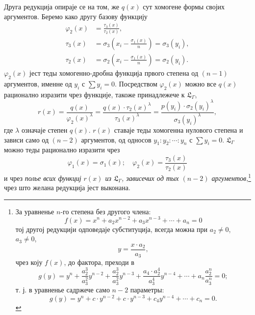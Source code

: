 ﻿\documentclass[11pt]{article}
\begin{document}
Друга редукција опираје се на том, же $q(x)$ сут хомогене формы својих аргументов. Беремо како другу базову функцију
\[
\begin{aligned}
\varphi_2(x)&=\frac{\tau_3(x)}{\tau_2(x)},\\
\tau_3(x)&=\sigma_3\left(x_i-\frac{\sigma_1(x)}{n}\right)=\sigma_3(y_i),\\
\tau_2(x)&=\sigma_2\left(x_i-\frac{\sigma_1(x)}{n}\right)=\sigma_2(y_i).
\end{aligned}
\]
$\varphi_2(x)$ јест теды хомогенно-дробна функција првого степена од $(n-1)$ аргументов, именне од $y_i$ с $\sum y_i=0$. Посредством $\varphi_2(x)$ можно все $q(x)$ рационално изразити чрез функције, такоже принадлежече к $\mathfrak L_\Gamma$,
\[
r(x)=\frac{q(x)}{\varphi_2(x)^\lambda}=\frac{q(x)\cdot\tau_2(x)^\lambda}{\tau_3(x)^\lambda}=\frac{p(y_i)\cdot\sigma_2(y_i)^\lambda}{\sigma_3(y_i)^\lambda},
\]
где $\lambda$ означаје степен $q(x)$. $r(x)$ ставаје теды хомогенна нулового степена и зависи само од $(n-2)$ аргументов, од односов $y_1:y_2:\cdots:y_n$ с $\sum y_i=0$. $\mathfrak L_\Gamma$ можно теды рационално изразити чрез
\[
\varphi_1(x)=\sigma_1(x);\quad \varphi_2(x)=\frac{\tau_3(x)}{\tau_2(x)}
\]
и чрез {\itshape полье всих функциј $r(x)$ из $\mathfrak L_\Gamma$, зависечих од тых $(n-2)$ аргументов},\footnote{За уравненье $n$-го степена без другого члена:
\[
f(x)=x^n+a_2x^{n-2}+a_3x^{n-3}+\cdots+a_n=0
\]
тој другој редукцији одповедаје субституција, всегда можна при $a_2\neq0$, $a_3\neq0$,
\[
y=\frac{x\cdot a_2}{a_3},
\]
чрез коју $f(x)$, до фактора, преходи в
\[
g(y)=y^n+\frac{a_2^3}{a_3^2}y^{n-2}+\frac{a_2^3}{a_3^2}y^{n-3}+\frac{a_4\cdot a_2^4}{a_3^4}y^{n-4}+\cdots+a_n\frac{a_2^n}{a_3^n}=0;
\]
т. ј. в уравненье садржече само $n-2$ параметры:
\[
g(y)=y^n+c\cdot y^{n-2}+c\cdot y^{n-3}+c_4y^{n-4}+\cdots+c_n=0.
\]} чрез што желана редукција јест выконана.
\end{document}
